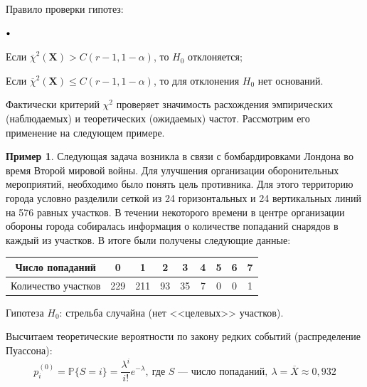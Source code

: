 \documentclass[oneside,final,14pt]{extreport}
\theoremstyle{plain}
\theoremstyle{definition}
\newtheorem*{exmp}{Пример}
\theoremstyle{named}
\newcommand\sbullet[1][.5]{\mathbin{\vcenter{\hbox{\scalebox{#1}{$\bullet$}}}}}
\newenvironment{compactlist}{
\begin{list}{{$\sbullet[.75]$}}{
\setlength\partopsep{0pt}
\setlength\parskip{0pt}
\setlength\parsep{0pt}
\setlength\topsep{0pt}
\setlength\itemsep{0pt}
}
}{
\end{list}
}
\begin{document}
Правило проверки гипотез:
\begin{compactlist}
    \item Если $\overline{\chi}^{2} \left(\mathbf{X}\right)>C(r-1,1-\alpha)$, то $H_0$ отклоняется;
    \item Если $\overline{\chi}^{2} \left(\mathbf{X}\right) \leqslant C(r-1,1-\alpha)$, то для отклонения $H_0$ нет оснований.
\end{compactlist}
\medskip
\begin{center}
\end{center}

Фактически критерий $\chi^{2}$ проверяет значимость расхождения эмпирических (наблюдаемых) и теоретических (ожидаемых) частот. Рассмотрим его применение на следующем примере.
\begin{exmp}
Следующая задача возникла в связи с бомбардировками Лондона во время Второй мировой войны. Для улучшения организации оборонительных мероприятий, необходимо было понять цель противника. Для этого территорию города условно разделили сеткой из 24 горизонтальных и 24 вертикальных линий на 576 равных участков. В течении некоторого времени в центре организации обороны города собиралась информация о количестве попаданий снарядов в каждый из участков. В итоге были получены следующие данные:
\begin{center}
    \begin{tabular}{|c|c|c|c|c|c|c|c|c|}
    \hline Число попаданий & 0 & 1 & 2 & 3 & 4 & 5 & 6 & 7 \\
    \hline Количество участков & 229 & 211 & 93 & 35 & 7 & 0 & 0 & 1 \\
    \hline
    \end{tabular}
\end{center}

Гипотеза $H_0$: стрельба случайна (нет <<целевых>> участков).

Высчитаем теоретические вероятности по закону редких событий (распределение Пуассона):
\begin{equation*}
    p_i^{(0)} = \mathbb{P}\{S=i\}=\frac{\lambda^{i}}{i !} e^{-\lambda}, ~\text{где $S$~--- число попаданий},~ \lambda = \overline{X} \approx 0,932
\end{equation*}
\end{exmp}
\end{document}
